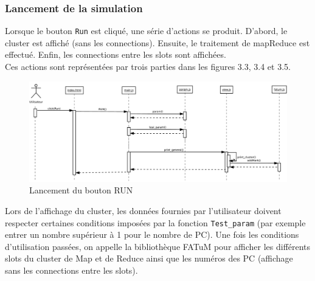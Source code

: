 \subsubsection{Lancement de la simulation}
Lorsque le bouton {\tt Run} est cliqué, une série d'actions se produit.
D'abord, le cluster est affiché (sans les connections). Ensuite, le traitement de mapReduce est effectué. Enfin, les connections entre les slots sont affichées.\\
Ces actions sont représentées par trois parties dans les figures 3.3, 3.4 et 3.5.
\begin{figure}[H]
  \centering
    \includegraphics[angle=90,scale=0.5]{diagram/diag_seq_init.pdf}
        \caption{Lancement du bouton RUN}
\end{figure}
Lors de l'affichage du cluster, les données fournies par l'utilisateur doivent respecter certaines conditions imposées par la fonction {\tt Test\_param} (par exemple entrer un nombre supérieur à 1 pour le nombre de PC). Une fois les conditions d'utilisation passées, on appelle la bibliothèque FATuM pour afficher les différents slots du cluster de Map et de Reduce ainsi que les numéros des PC (affichage sans les connections entre les slots).

